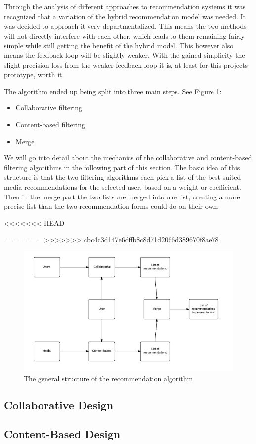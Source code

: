 Through the analysis of different approaches to recommendation systems it was recognized that a variation of the hybrid recommendation model was needed. It was decided to approach it very departmentalized. This means the two methods will not directly interfere with each other, which leads to them remaining fairly simple while still getting the benefit of the hybrid model. This however also means the feedback loop will be slightly weaker. With the gained simplicity the slight precision loss from the weaker feedback loop it is, at least for this projects prototype, worth it.

The algorithm ended up being split into three main steps. See Figure \ref{GenRecAlgo}:
\begin{itemize}
	\item Collaborative filtering
	\item Content-based filtering
	\item Merge
\end{itemize}

We will go into detail about the mechanics of the collaborative and content-based filtering algorithms in the following part of this section. The basic idea of this structure is that the two filtering algorithms each pick a list of the best suited media recommendations for the selected user, based on a weight or coefficient. Then in the merge part the two lists are merged into one list, creating a more precise list than the two recommendation forms could do on their own.

<<<<<<< HEAD

=======
>>>>>>> cbc4c3d147e6dffb8c8d71d2066d389670f8ae78
\begin{figure}[H]
\centering
\includegraphics[width=1\textwidth]{Images/RecommendationAlgo.png}
\caption{The general structure of the recommendation algorithm}
\label{GenRecAlgo}
\end{figure}


\subsection{Collaborative Design}
\label{CollaborativeDes}

\subsection{Content-Based Design}
\label{ContentBasedDes}
